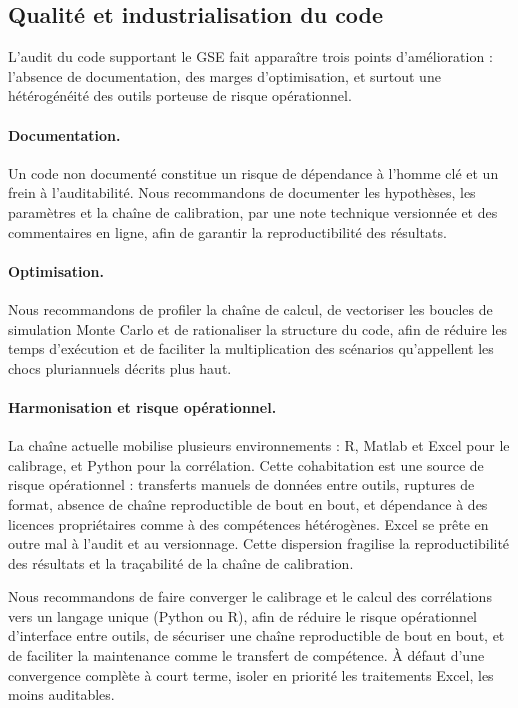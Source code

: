 \documentclass[11pt,a4paper]{article}
\begin{document}
\subsection{Qualité et industrialisation du code}

L'audit du code supportant le GSE fait apparaître trois points d'amélioration : l'absence de documentation, des marges d'optimisation, et surtout une hétérogénéité des outils porteuse de risque opérationnel.

\paragraph{Documentation.} Un code non documenté constitue un risque de dépendance à l'homme clé et un frein à l'auditabilité. Nous recommandons de documenter les hypothèses, les paramètres et la chaîne de calibration, par une note technique versionnée et des commentaires en ligne, afin de garantir la reproductibilité des résultats.

\paragraph{Optimisation.} Nous recommandons de profiler la chaîne de calcul, de vectoriser les boucles de simulation Monte Carlo et de rationaliser la structure du code, afin de réduire les temps d'exécution et de faciliter la multiplication des scénarios qu'appellent les chocs pluriannuels décrits plus haut.

\paragraph{Harmonisation et risque opérationnel.} La chaîne actuelle mobilise plusieurs environnements : R, Matlab et Excel pour le calibrage, et Python pour la corrélation. Cette cohabitation est une source de risque opérationnel : transferts manuels de données entre outils, ruptures de format, absence de chaîne reproductible de bout en bout, et dépendance à des licences propriétaires comme à des compétences hétérogènes. Excel se prête en outre mal à l'audit et au versionnage. Cette dispersion fragilise la reproductibilité des résultats et la traçabilité de la chaîne de calibration.

\begin{insightbox}
Nous recommandons de faire converger le calibrage et le calcul des corrélations vers un langage unique (Python ou R), afin de réduire le risque opérationnel d'interface entre outils, de sécuriser une chaîne reproductible de bout en bout, et de faciliter la maintenance comme le transfert de compétence. À défaut d'une convergence complète à court terme, isoler en priorité les traitements Excel, les moins auditables.
\end{insightbox}
\end{document}

